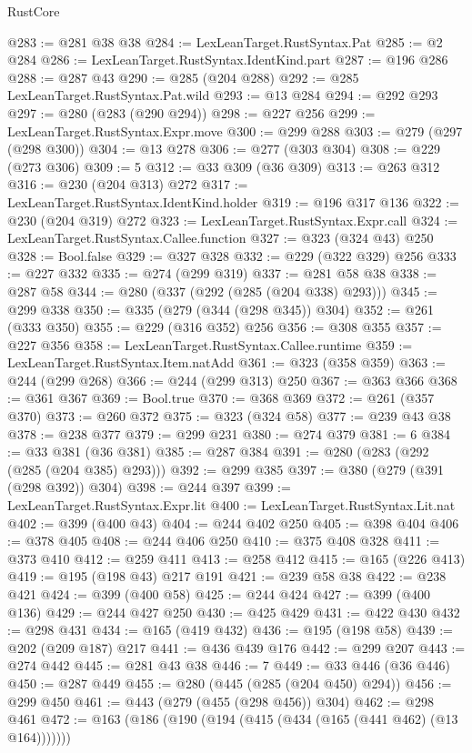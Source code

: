 \begin{lexlean}{RustCore}
\begin{coremodule}
{\begin{coremodule}
{{{{{{{@283 := @281 @38 @38
@284 := LexLeanTarget.RustSyntax.Pat
@285 := @2 @284
@286 := LexLeanTarget.RustSyntax.IdentKind.part
@287 := @196 @286
@288 := @287 @43
@290 := @285 (@204 @288)
@292 := @285 LexLeanTarget.RustSyntax.Pat.wild
@293 := @13 @284
@294 := @292 @293
@297 := @280 (@283 (@290 @294))
@298 := @227 @256
@299 := LexLeanTarget.RustSyntax.Expr.move
@300 := @299 @288
@303 := @279 (@297 (@298 @300))
@304 := @13 @278
@306 := @277 (@303 @304)
@308 := @229 (@273 @306)
@309 := 5
@312 := @33 @309 (@36 @309)
@313 := @263 @312
@316 := @230 (@204 @313) @272
@317 := LexLeanTarget.RustSyntax.IdentKind.holder
@319 := @196 @317 @136
@322 := @230 (@204 @319) @272
@323 := LexLeanTarget.RustSyntax.Expr.call
@324 := LexLeanTarget.RustSyntax.Callee.function
@327 := @323 (@324 @43) @250
@328 := Bool.false
@329 := @327 @328
@332 := @229 (@322 @329) @256
@333 := @227 @332
@335 := @274 (@299 @319)
@337 := @281 @58 @38
@338 := @287 @58
@344 := @280 (@337 (@292 (@285 (@204 @338) @293)))
@345 := @299 @338
@350 := @335 (@279 (@344 (@298 @345)) @304)
@352 := @261 (@333 @350)
@355 := @229 (@316 @352) @256
@356 := @308 @355
@357 := @227 @356
@358 := LexLeanTarget.RustSyntax.Callee.runtime
@359 := LexLeanTarget.RustSyntax.Item.natAdd
@361 := @323 (@358 @359)
@363 := @244 (@299 @268)
@366 := @244 (@299 @313) @250
@367 := @363 @366
@368 := @361 @367
@369 := Bool.true
@370 := @368 @369
@372 := @261 (@357 @370)
@373 := @260 @372
@375 := @323 (@324 @58)
@377 := @239 @43 @38
@378 := @238 @377
@379 := @299 @231
@380 := @274 @379
@381 := 6
@384 := @33 @381 (@36 @381)
@385 := @287 @384
@391 := @280 (@283 (@292 (@285 (@204 @385) @293)))
@392 := @299 @385
@397 := @380 (@279 (@391 (@298 @392)) @304)
@398 := @244 @397
@399 := LexLeanTarget.RustSyntax.Expr.lit
@400 := LexLeanTarget.RustSyntax.Lit.nat
@402 := @399 (@400 @43)
@404 := @244 @402 @250
@405 := @398 @404
@406 := @378 @405
@408 := @244 @406 @250
@410 := @375 @408 @328
@411 := @373 @410
@412 := @259 @411
@413 := @258 @412
@415 := @165 (@226 @413)
@419 := @195 (@198 @43) @217 @191
@421 := @239 @58 @38
@422 := @238 @421
@424 := @399 (@400 @58)
@425 := @244 @424
@427 := @399 (@400 @136)
@429 := @244 @427 @250
@430 := @425 @429
@431 := @422 @430
@432 := @298 @431
@434 := @165 (@419 @432)
@436 := @195 (@198 @58)
@439 := @202 (@209 @187) @217
@441 := @436 @439 @176
@442 := @299 @207
@443 := @274 @442
@445 := @281 @43 @38
@446 := 7
@449 := @33 @446 (@36 @446)
@450 := @287 @449
@455 := @280 (@445 (@285 (@204 @450) @294))
@456 := @299 @450
@461 := @443 (@279 (@455 (@298 @456)) @304)
@462 := @298 @461
@472 := @163 (@186 (@190 (@194 (@415 (@434 (@165 (@441 @462) (@13 @164)))))))
}}}}}}}
\end{coremodule}}
\end{coremodule}
\end{lexlean}
